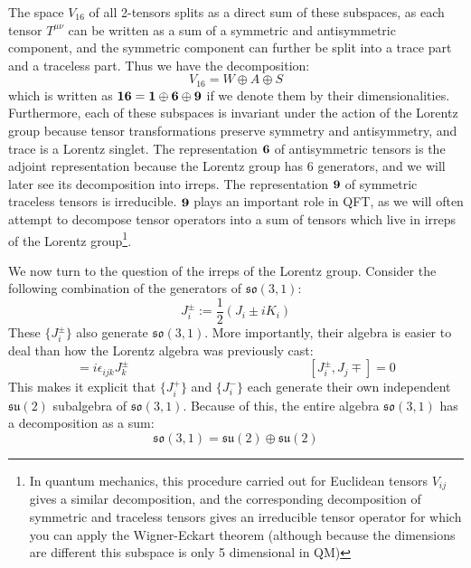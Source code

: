 \documentclass[11pt, oneside]{article}   	%
\theoremstyle{definition}
\begin{document}
The space $V_{16}$ of all 2-tensors splits as a direct sum of these subspaces, as each 
tensor $T^{\mu\nu}$ can be written as a sum of a symmetric and antisymmetric component, and the symmetric component 
can further be split into a trace part and a traceless part. Thus we have the decomposition:
\begin{equation}
	V_{16} = W\oplus A\oplus S
\end{equation}
which is written as $\bf 16 = 1\oplus 6\oplus 9$ if we denote them by their dimensionalities. Furthermore, each of these 
subspaces is invariant under the action of the Lorentz group because tensor transformations preserve symmetry and 
antisymmetry, and trace is a Lorentz singlet. The representation $\bf 6$ of antisymmetric tensors is the adjoint representation 
because the Lorentz group has 6 generators, and we will later see its decomposition into irreps. The representation $\bf 9$ 
of symmetric traceless tensors is irreducible. $\bf 9$ plays an important role in QFT, as 
we will often attempt to decompose tensor operators into a sum of tensors which live in irreps of the Lorentz group\footnote{In 
quantum mechanics, this procedure carried out for 
Euclidean tensors $V_{ij}$ gives a similar decomposition, and the corresponding decomposition of symmetric and 
traceless tensors gives an irreducible tensor operator for which you can apply the Wigner-Eckart theorem (although because 
the dimensions are different this subspace is only 5 dimensional in QM)}. 


We now turn to the question of the irreps of the Lorentz group. Consider the following combination of the generators of 
$\mathfrak{so}(3, 1)$:
\begin{equation}
	J_i^\pm := \frac{1}{2}(J_i \pm iK_i)
\end{equation}
These $\{J_i^\pm\}$ also generate $\mathfrak{so}(3, 1)$. More importantly, their algebra is easier to deal than how the 
Lorentz algebra was previously cast:
\begin{equation}
	[J_i^\pm, J_j^\pm] = i\epsilon_{ijk} J_k^\pm \;\;\;\;\;\;\;\;\;\;\;\;\;\;\;\;\;\;\;\;\;\;\;\;\;\;\;\;\;\;\;\;\;\;\;\;\;\;\;\;\;\;\;\;\;\;\;\;\;\;\;
	[J_i^\pm, J_j\mp] = 0
\end{equation}
This makes it explicit that $\{J_i^+\}$ and $\{J_i^-\}$ each generate their own independent $\mathfrak{su}(2)$ subalgebra 
of $\mathfrak{so}(3, 1)$. Because of this, the entire algebra $\mathfrak{so}(3, 1)$ has a decomposition as a sum:
\begin{equation}
	\mathfrak{so}(3, 1) = \mathfrak{su}(2)\oplus\mathfrak{su}(2)
\end{equation}
\end{document}
